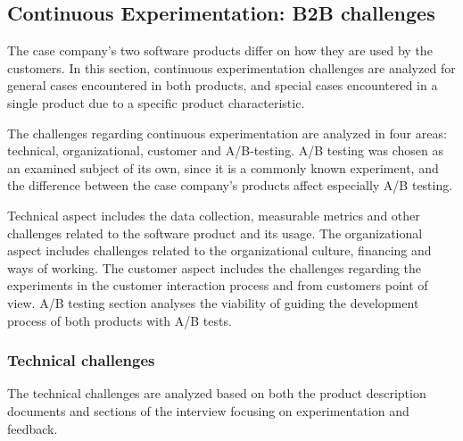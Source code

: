 \documentclass[english]{tktltiki2}
\theoremstyle{definition}
\theoremstyle{remark}
\begin{document}


\subsection{Continuous Experimentation: B2B challenges}
The case company's two software products differ on how they are used by the customers. In this section, continuous experimentation challenges are analyzed for general cases encountered in both products, and special cases encountered in a single product due to a specific product characteristic. 

The challenges regarding continuous experimentation are analyzed in four areas: technical, organizational, customer and A/B-testing. A/B testing was chosen as an examined subject of its own, since it is a commonly known experiment, and the difference between the case company's products affect especially A/B testing.  

Technical aspect includes the data collection, measurable metrics and other challenges related to the software product and its usage. The organizational aspect includes challenges related to the organizational culture, financing and ways of working. The customer aspect includes the challenges regarding the experiments in the customer interaction process and from customers point of view. A/B testing section analyses the viability of guiding the development process of both products with A/B tests.
\subsubsection{Technical challenges}
The technical challenges are analyzed based on both the product description documents and sections of the interview focusing on experimentation and feedback.
\end{document}
